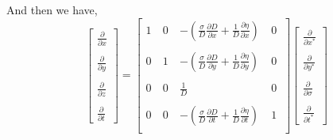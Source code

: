 \documentclass[oribibl]{llncs}
\begin{document}
And then we have,
\begin{equation}      
\left[                 
  \begin{array}{c}  
    \frac{\partial}{\partial x}  \\  \nonumber \\ 
    \frac{\partial}{\partial y}  \\ \nonumber \\ 
    \frac{\partial}{\partial z}  \\ \nonumber \\ 
    \frac{\partial}{\partial t} 
  \end{array}
\right]
=  
\left[             
  \begin{array}{cccc}  
   1\  & 0\ & -\left( \frac{\sigma}{D} \frac{\partial D}{\partial x} + \frac{1}{D}\frac{\partial \eta}{\partial x} \right)\ & 0\ \\   \nonumber \\ 
   0\  & 1\ & -\left(\frac{\sigma}{D} \frac{\partial D}{\partial y} + \frac{1}{D}\frac{\partial \eta}{\partial y} \right)\ & 0\ \\   \nonumber \\ 
   0\  & 0\ & \frac{1}{D} \													        & 0 \ \\   \nonumber \\ 
   0\  & 0\ & -\left(\frac{\sigma}{D} \frac{\partial D}{\partial t} + \frac{1}{D}\frac{\partial \eta}{\partial t} \right)\   & 1\ \\  
  \end{array}
\right]              
\left[                 
  \begin{array}{c}  
    \frac{\partial}{\partial x^*}  \\  \nonumber \\ 
    \frac{\partial}{\partial y^*}  \\ \nonumber \\ 
    \frac{\partial}{\partial \sigma}  \\ \nonumber \\ 
    \frac{\partial}{\partial t^*} 
  \end{array}
\right]
\end{equation}
\end{document}
